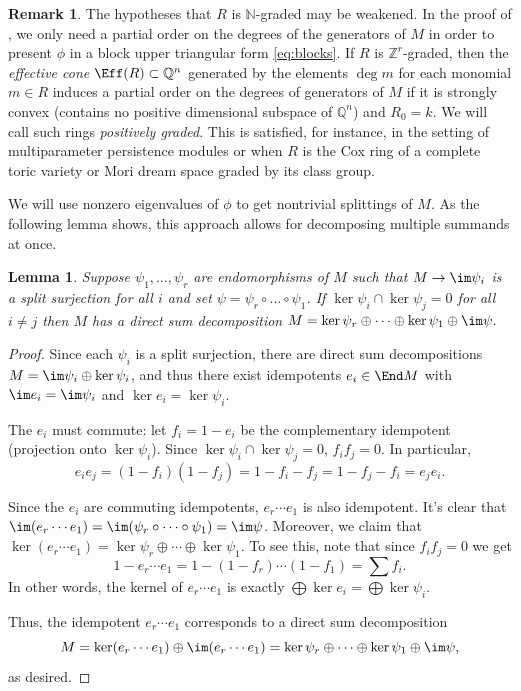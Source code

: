 \documentclass[12pt]{amsart}
\def\ZZ{\mathbb Z}
\def\NN{\mathbb N}
\def\QQ{\mathbb Q}
\theoremstyle{theorem}
\numberwithin{thm}{section}
\newtheorem{lem}[thm]{Lemma}
\theoremstyle{definition}
\newtheorem{rem}[thm]{Remark}
\begin{document}
\begin{rem}\label{rem:grading}
  The hypotheses that $R$ is $\NN$-graded may be weakened. In the proof of , we only need a partial order on the degrees of the generators of $M$ in order to present $\phi$ in a block upper triangular form \eqref{eq:blocks}. If $R$ is $\ZZ^r$-graded, then the \emph{effective cone} $\Eff(R)\subset\QQ^n$ generated by the elements $\deg m$ for each monomial $m \in R$ induces a partial order on the degrees of generators of $M$ if it is strongly convex (contains no positive dimensional subspace of $\QQ^n$) and $R_0 = k$. We will call such rings \emph{positively graded}. %
  This is satisfied, for instance, in the setting of multiparameter persistence modules or when $R$ is the Cox ring of a complete toric variety or Mori dream space graded by its class group.
\end{rem}

We will use nonzero eigenvalues of $\phi$ to get nontrivial splittings of $M$. As the following lemma shows, this approach allows for decomposing multiple summands at once.

\begin{lem}\label{lem:decomposition}
  Suppose $\psi_1,\dots,\psi_r$ are endomorphisms of $M$ such that $M\to\im\psi_i$ is a split surjection for all $i$ and set $\psi = \psi_r\circ\dots\circ\psi_1$.
  If $\ker\psi_i\cap\ker \psi_j = 0$ for all $i\neq j$ then $M$ has a direct sum decomposition \( M = \ker\psi_r \oplus \cdots \oplus \ker\psi_1 \oplus \im\psi. \)
\end{lem}
\begin{proof}
  Since each $\psi_i$ is a split surjection, there are direct sum decompositions $M=\im \psi_i \oplus \ker \psi_i$, and thus there exist idempotents $e_i\in \End M$ with $\im e_i = \im \psi_i$ and $\ker e_i = \ker \psi_i$.

  The $e_i$ must commute: let $f_i = 1- e_i$ be the complementary idempotent (projection onto $\ker \psi_i$). Since $\ker \psi_i \cap \ker \psi_j=0$, $f_if_j=0$. In particular,
  \[ e_ie_j =(1-f_i)(1-f_j) = 1-f_i-f_j= 1-f_j-f_i = e_j e_i. \]

  Since the $e_i$ are commuting idempotents, $e_r\cdots e_1$ is also idempotent. It's clear that $\im(e_r\cdots e_1) = \im (\psi_r\circ \dots\circ \psi_1) = \im \psi$. Moreover, we claim that $\ker(e_r\cdots e_1) = \ker \psi_r \oplus \cdots \oplus \ker \psi_1$. To see this, note that since $f_if_j=0$ we get
  \[ 1-e_r\cdots e_1 = 1-(1-f_r)\cdots (1-f_1) = \sum f_i. \]
  In other words, the kernel of $e_r\cdots e_1$ is exactly $\bigoplus \ker e_i =\bigoplus \ker \psi_i$.

  Thus, the idempotent $e_r\cdots e_1$ corresponds to a direct sum decomposition
  \[ M = \ker(e_r\cdots e_1) \oplus \im(e_r\cdots e_1) = \ker\psi_r \oplus \cdots \oplus \ker\psi_1 \oplus \im\psi, \]
  as desired.
\end{proof}
\end{document}
